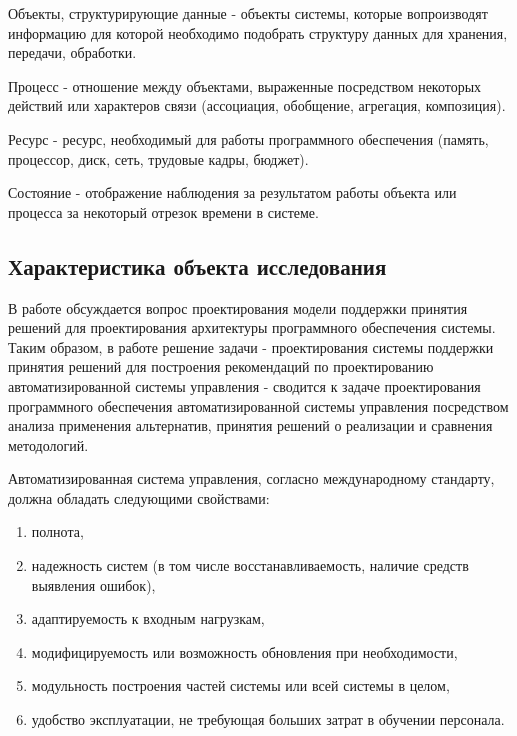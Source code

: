 Объекты, структурирующие данные - объекты системы, которые вопроизводят информацию для которой необходимо подобрать структуру данных для хранения, передачи, обработки.

Процесс - отношение между объектами, выраженные посредством некоторых действий или характеров связи (ассоциация, обобщение, агрегация, композиция).

Ресурс - ресурс, необходимый для работы программного обеспечения (память, процессор, диск, сеть, трудовые кадры, бюджет).

Состояние - отображение наблюдения за результатом работы объекта или процесса за некоторый отрезок времени в системе.

\subsection{Характеристика объекта исследования}\label{sec:ch1/sec2/sec2}
В работе обсуждается вопрос проектирования модели поддержки принятия решений для проектирования архитектуры программного обеспечения системы. 
Таким образом, в работе решение задачи - проектирования системы поддержки принятия решений для построения рекомендаций по проектированию автоматизированной системы управления - сводится к задаче проектирования программного обеспечения автоматизированной системы управления посредством анализа применения альтернатив, принятия решений о реализации и сравнения методологий.

Автоматизированная система управления, согласно международному стандарту\cite{ACSSt}, должна обладать следующими свойствами:
\begin{enumerate}
    \item  полнота,
    \item  надежность систем (в том числе восстанавливаемость, наличие средств выявления ошибок),
    \item  адаптируемость к входным нагрузкам,
    \item  модифицируемость или возможность обновления при необходимости,
    \item  модульность построения частей системы или всей системы в целом, 
    \item  удобство эксплуатации, не требующая больших затрат в обучении персонала.
\end{enumerate}  

